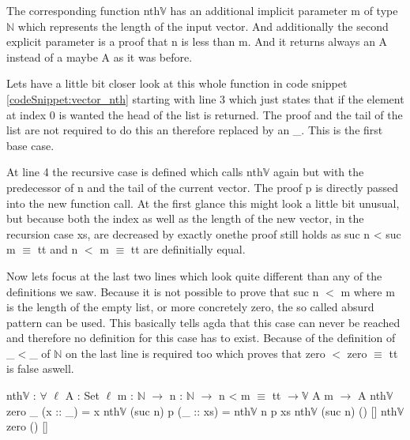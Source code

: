 The corresponding function nth$\mathbb{V}$ has an additional implicit parameter m of type $\mathbb{N}$ which represents the length of the input vector. 
And additionally the second explicit parameter is a proof that n is less than m. And it returns always an A instead of a maybe A as it was before.

Lets have a little bit closer look at this whole function in code snippet \ref{codeSnippet:vector_nth} starting with line 3 which just states that if the element at index 0 is wanted the head of the list is returned. 
The proof and the tail of the list are not required to do this an therefore replaced by an \_. This is the first base case.

At line 4 the recursive case is defined which calls nth$\mathbb{V}$ again but with the predecessor of n and the tail of the current vector.
The proof p is directly passed into the new function call. At the first glance this might look a little bit unusual, but because both the index as well as the length of the new vector, in the recursion case xs, 
are decreased by exactly onethe proof still holds as suc n < suc m $\equiv$ tt and n $<$ m $\equiv$ tt are definitially equal.

Now lets focus at the last two lines which look quite different than any of the definitions we saw.
Because it is not possible to prove that suc n $<$ m where m is the length of the empty list, or more concretely zero, the so called absurd pattern can be used. This basically tells agda that this case can never be reached and therefore no definition for this case has to exist.
Because of the definition of \_$<$\_ of $\mathbb{N}$ on the last line is required too which proves that zero $<$ zero $\equiv$ tt is false aswell.  

\begin{codesnippet}[mathescape=true, caption={Definition of nth function in Agda}, label={codeSnippet:vector_nth}]
nth$\mathbb{V}$ : $\forall$ {$\ell$} {A : Set $\ell$} {m : $\mathbb{N}$} $\rightarrow$
       n : $\mathbb{N}$ $\rightarrow$ n < m $\equiv$ tt $\rightarrow \mathbb{V}$ A m $\rightarrow$ A
nth$\mathbb{V}$ zero _ (x :: _) = x
nth$\mathbb{V}$ (suc n) p (_ :: xs) = nth$\mathbb{V}$ n p xs
nth$\mathbb{V}$ (suc n) () []
nth$\mathbb{V}$ zero () []
\end{codesnippet}

